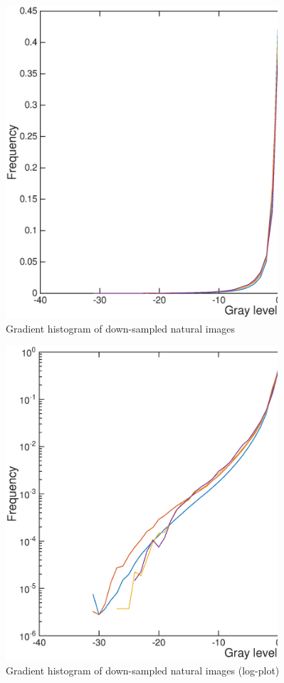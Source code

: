 \documentclass[11pt, oneside]{article}   	%
\begin{document}
\begin{enumerate}
\begin{figure}[H]
	\centering
	\includegraphics[width=0.9\textwidth]{step5}
	\caption{Gradient histogram of down-sampled natural images}
	\label {fig:step5}
\end{figure}
\begin{figure}[H]
	\centering
	\includegraphics[width=0.9\textwidth]{step5log}
	\caption{Gradient histogram of down-sampled natural images (log-plot)}
	\label {fig:step5log}
\end{figure}


\end{enumerate}
\end{document}

